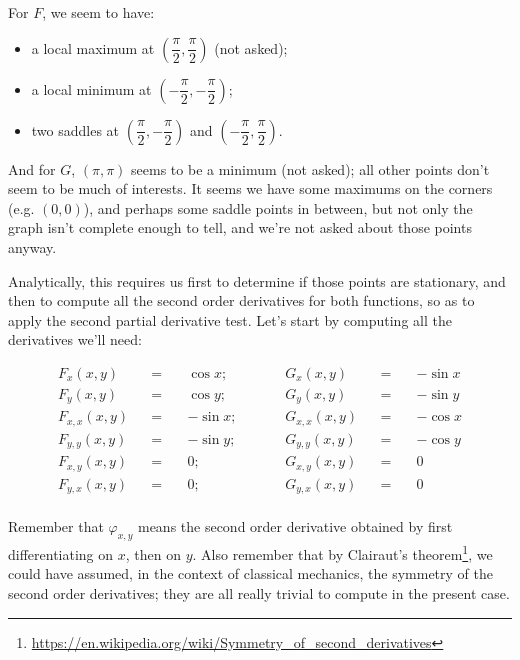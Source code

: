 \documentclass[solutions.tex]{subfiles}
\begin{document}

For $F$, we seem to have:
\begin{itemize}
	\item a local maximum at $(\dfrac\pi2,\dfrac\pi2)$ (not asked);
	\item a local minimum at $(-\dfrac\pi2,-\dfrac\pi2)$;
	\item two saddles at $(\dfrac\pi2,-\dfrac\pi2)$ and $(-\dfrac\pi2,\dfrac\pi2)$.
\end{itemize}

And for $G$, $(\pi,\pi)$ seems to be a minimum (not asked); all other points don't
seem to be much of interests. It seems we have some maximums on the corners
(e.g. $(0,0)$), and perhaps some saddle points in between, but not only the graph
isn't complete enough to tell, and we're not asked about those points anyway.

\hrr

Analytically, this requires us first to determine if those points are
stationary, and then to compute  all the second order derivatives
for both functions, so as to apply the second partial derivative test.
Let's start by computing all the derivatives we'll need:

\begin{equation*} \begin{aligned}
	F_x(x,y) &&=\quad& \cos x; &&\quad&
		G_x(x,y) &&=\quad& -\sin x \\
	F_y(x,y) &&=\quad& \cos y; &&\quad&
		G_y(x,y) &&=\quad& -\sin y \\
	F_{x,x}(x,y) &&=\quad& -\sin x; &&\quad&
		G_{x,x}(x,y) &&=\quad& -\cos x \\
	F_{y,y}(x,y) &&=\quad& -\sin y; &&\quad&
		G_{y,y}(x,y) &&=\quad& -\cos y \\
	F_{x,y}(x,y) &&=\quad& 0; &&\quad&
		G_{x,y}(x,y) &&=\quad& 0 \\
	F_{y,x}(x,y) &&=\quad& 0; &&\quad&
		G_{y,x}(x,y) &&=\quad& 0 \\
\end{aligned} \end{equation*}

\begin{remark} Remember that $\varphi_{x,y}$ means the second order derivative
obtained by first differentiating on $x$, then on $y$. Also remember that
by Clairaut's theorem\footnote{
\url{https://en.wikipedia.org/wiki/Symmetry\_of\_second\_derivatives}}, we
could have assumed, in the context of classical mechanics, the symmetry of
the second order derivatives; they are all really trivial to compute in
the present case.
\end{remark}
\end{document}
